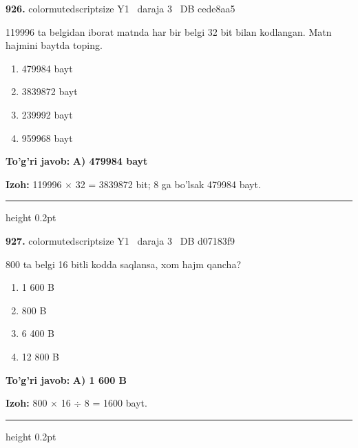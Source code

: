 \documentclass[10pt,a4paper,oneside]{article}
\begin{document}
\noindent\textbf{\color{ink}926.}  {color{muted}scriptsize Y1 \textbullet\ daraja 3 \textbullet\ DB cede8aa5}
\par
119996 ta belgidan iborat matnda har bir belgi 32 bit bilan kodlangan. Matn hajmini baytda toping.
\begin{enumerate}[label=\Alph*),leftmargin=9mm]
\item 479984 bayt
\item 3839872 bayt
\item 239992 bayt
\item 959968 bayt
\end{enumerate}
\begin{tcolorbox}[enhanced,breakable,colback=teal!4,colframe=teal!50!black,boxrule=0.5pt,arc=1.1mm,left=3mm,right=3mm,top=1.7mm,bottom=1.7mm,before skip=2mm,after skip=2mm]
\textbf{\color{teal}To'g'ri javob:} \textbf{A) 479984 bayt}
\par\smallskip
\textbf{Izoh:} 119996 \ensuremath{\times} 32 = 3839872 bit; 8 ga bo'lsak 479984 bayt.
\end{tcolorbox}
\vspace{2mm}\hrule height 0.2pt \vspace{3mm}

\noindent\textbf{\color{ink}927.}  {color{muted}scriptsize Y1 \textbullet\ daraja 3 \textbullet\ DB d07183f9}
\par
800 ta belgi 16 bitli kodda saqlansa, xom hajm qancha?
\begin{enumerate}[label=\Alph*),leftmargin=9mm]
\item 1 600 B
\item 800 B
\item 6 400 B
\item 12 800 B
\end{enumerate}
\begin{tcolorbox}[enhanced,breakable,colback=teal!4,colframe=teal!50!black,boxrule=0.5pt,arc=1.1mm,left=3mm,right=3mm,top=1.7mm,bottom=1.7mm,before skip=2mm,after skip=2mm]
\textbf{\color{teal}To'g'ri javob:} \textbf{A) 1 600 B}
\par\smallskip
\textbf{Izoh:} 800 \ensuremath{\times} 16 \ensuremath{\div} 8 = 1600 bayt.
\end{tcolorbox}
\vspace{2mm}\hrule height 0.2pt \vspace{3mm}
\end{document}
